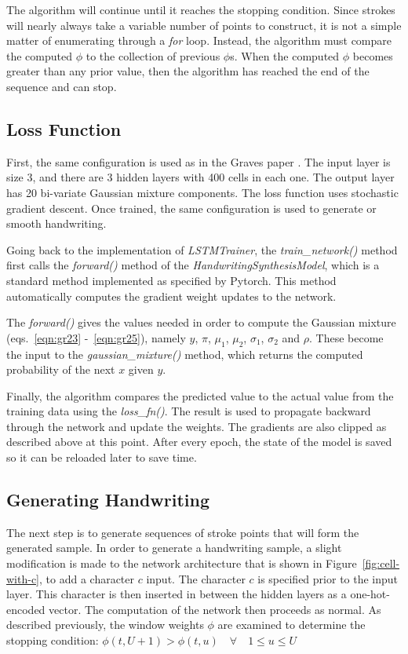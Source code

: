 \documentclass{article}
\begin{document}
The algorithm will continue until it reaches the stopping condition.  Since strokes will nearly always take a variable number of points to construct, it is not a simple matter of enumerating through a \textit{for} loop. Instead, the algorithm must compare the computed $\phi$ to the collection of previous $\phi$s. When the computed $\phi$ becomes greater than any prior value, then the algorithm has reached the end of the sequence and can stop.

\subsection{Loss Function}
First, the same configuration is used as in the Graves paper \cite{DBLP:journals/corr/Graves13}. The input layer is size 3, and there are 3 hidden layers with 400 cells in each one. The output layer has 20 bi-variate Gaussian mixture components. The loss function uses stochastic gradient descent. Once trained, the same configuration is used to generate or smooth handwriting.

Going back to the implementation of \textit{LSTMTrainer}, the \textit{train\_network()} method first calls the \textit{forward()} method of the \textit{HandwritingSynthesisModel}, which is a standard method implemented as specified by Pytorch. This method automatically computes the gradient weight updates to the network.

The \textit{forward()} gives the values needed in order to compute the Gaussian mixture (eqs.~\ref{eqn:gr23} -~\ref{eqn:gr25}), namely $y$, $\pi$, $\mu_1$, $\mu_2$, $\sigma_1$, $\sigma_2$ and $\rho$. These become the input to the \textit{gaussian\_mixture()} method, which returns the computed probability of the next $x$ given $y$.

Finally, the algorithm compares the predicted value to the actual value from the training data using the \textit{loss\_fn()}. The result is used to propagate backward through the network and update the weights. The gradients are also clipped as described above at this point. After every epoch, the state of the model is saved so it can be reloaded later to save time.

\subsection{Generating Handwriting}
The next step is to generate sequences of stroke points that will form the generated sample. In order to generate a handwriting sample, a slight modification is made to the network architecture that is shown in Figure~\ref{fig:cell-with-c}, to add a character $c$ input.  The character $c$ is specified prior to the input layer. This character is then inserted in between the hidden layers as a one-hot-encoded vector. The computation of the network then proceeds as normal. As described previously, the window weights $\phi$ are examined to determine the stopping condition: $\phi(t,U+1) > \phi(t,u) \quad \forall \quad 1\leq u\leq U$
\end{document}
